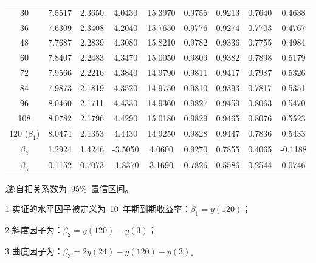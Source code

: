 \begin{center}
\begin{threeparttable}
\begin{tabular}{c c c c c c c c c}
   30 &  7.5517 &  2.3650  & 4.0430 & 15.3970 &  0.9755  & 0.9213  & 0.7640  & 0.4638\\
   36 &  7.6309 &  2.3408  & 4.2040 & 15.7650 &  0.9776  & 0.9274  & 0.7703  & 0.4767\\
   48 &  7.7687 &  2.2839  & 4.3080 & 15.8210 &  0.9782  & 0.9336  & 0.7755  & 0.4984\\
   60 &  7.8407 &  2.2483  & 4.3470 & 15.0050 &  0.9809  & 0.9382  & 0.7898  & 0.5179\\
   72 &  7.9566 &  2.2216  & 4.3840 & 14.9790 &  0.9811  & 0.9417  & 0.7987  & 0.5326\\
   84 &  7.9873 &  2.1819  & 4.3520 & 14.9750 &  0.9810  & 0.9393  & 0.7817  & 0.5351\\
   96 &  8.0460 &  2.1711  & 4.4330 & 14.9360 &  0.9827  & 0.9459  & 0.8063  & 0.5470\\
  108 &  8.0782 &  2.1796  & 4.4290 & 15.0180 &  0.9829  & 0.9465  & 0.8076  & 0.5523\\
  \midrule
120 ($\beta_1$)\tnote{1}
      &8.0474& 2.1353  & 4.4430 & 14.9250 &  0.9828  & 0.9447  & 0.7836  & 0.5433\\
$\beta_2$\tnote{2}
      &  1.2924 &  1.4246  &\hspace{-0.5ex}-3.5050 &  4.0600 &  0.9270  & 0.7855  & 0.4065  &\hspace{-0.5ex}-0.1188\\
$\beta_3$\tnote{3}
      &0.1152& 0.7073  &\hspace{-0.5ex}-1.8370 &  3.1690 &  0.7826  & 0.5586  & 0.2544  & 0.0746\\
   \hline \hline
 \end{tabular}
 \small{%
  \emph{注}:自相关系数为~95\%~置信区间。
 \begin{tablenotes}
\item [1] 实证的水平因子被定义为~10~年期到期收益率：$\beta_1=y(120)$；
\item [2] 斜度因子为：$\beta_2=y(120)-y(3)$；
\item [3] 曲度因子为：$\beta_3=2y(24)-y(120)-y(3)$。
\end{tablenotes}
}%
\end{threeparttable}
\end{center}
